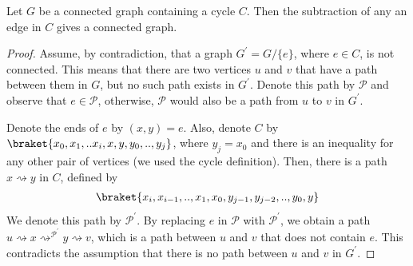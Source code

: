 \begin{claim}
  \label{claim:subtract}
  Let $G$ be a connected graph containing a cycle $C$. Then the subtraction of any an edge in $C$ gives a connected graph. 
\end{claim}
\begin{proof}
Assume, by contradiction, that a graph $G^{\prime} = G / \{ e \} $, where $e \in C$, is not connected. This means that there are two vertices $u$ and $v$ that have a path between them in $G$, but no such path exists in $G^{\prime}$. Denote this path by $\mathcal{P}$ and observe that $e \in \mathcal{P}$, otherwise, $\mathcal{P}$ would also be a path from $u$ to $v$ in $G^{\prime}$.

Denote the ends of $e$ by $(x,y)=e$. Also, denote $C$ by $\braket{x_{0},x_{1},..x_{i},x,y,y_{0},..,y_{j}}$, where $y_{j}=x_{0}$ and there is an inequality for any other pair of vertices (we used the cycle definition). Then, there is a path $x \rightsquigarrow y$ in $C$, defined by 
\begin{equation*}
  \begin{split}
\braket{x_{i},x_{i-1},..,x_{1},x_{0},y_{j-1},y_{j-2},..,y_{0},y}
  \end{split}
\end{equation*}
 We denote this path by $\mathcal{P}^{\prime}$. By replacing $e$ in $\mathcal{P}$ with $\mathcal{P}^{\prime}$, we obtain a path $u \rightsquigarrow x \rightsquigarrow^{\mathcal{P}^\prime} y \rightsquigarrow v$, which is a path between $u$ and $v$ that does not contain $e$. This contradicts the assumption that there is no path between $u$ and $v$ in $G^{\prime}$.
\end{proof}






